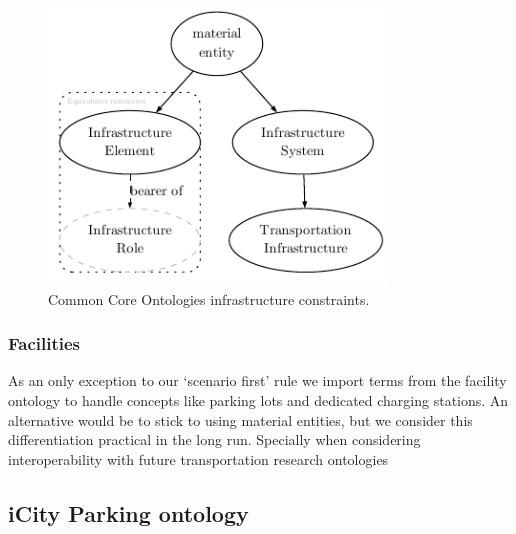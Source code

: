 \begin{figure}[h]
    \centering
    \includegraphics[width=0.8\textwidth]{images/infrastructureSystem}
    \caption{Common Core Ontologies infrastructure constraints.}
    \label{infrastructurefigs} 
\end{figure}

\subsubsection{Facilities}

As an only exception to our `scenario first' rule we import terms from the
facility ontology to handle concepts like parking lots and dedicated charging
stations. An alternative would be to stick to using material entities, but we
consider this differentiation practical in the long run. Specially when
considering interoperability with future transportation research ontologies


\subsection{iCity Parking ontology}

